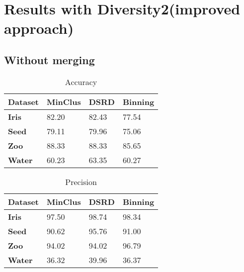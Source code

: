 \section{Results with Diversity2(improved approach)}
\subsection{Without merging}

\begin{table}[H]
\caption{Accuracy} 
\begin{center}
		\begin{tabular}{ | l | l | l | l |}
				\hline

				\textbf{Dataset} & \textbf{MinClus} & \textbf{DSRD} & \textbf{Binning} \\ \hline
                \textbf{Iris} & 82.20 & 82.43 & 77.54 \\ \hline
                \textbf{Seed} & 79.11 & 79.96 & 75.06 \\ \hline
                \textbf{Zoo} & 88.33 & 88.33 & 85.65  \\ \hline
                \textbf{Water} & 60.23 & 63.35 & 60.27  \\ \hline
		\end{tabular}
\end{center}
\label{table:acc1}
\end{table}



\begin{table}[H]
\caption{Precision} 
\begin{center}
		\begin{tabular}{ | l | l | l | l |}
				\hline

				\textbf{Dataset} & \textbf{MinClus} & \textbf{DSRD} & \textbf{Binning} \\ \hline

                \textbf{Iris} & 97.50 & 98.74 & 98.34 \\ \hline
                \textbf{Seed} & 90.62 & 95.76 & 91.00 \\ \hline
                \textbf{Zoo} & 94.02 & 94.02 & 96.79  \\ \hline
                \textbf{Water} & 36.32 & 39.96 & 36.37 \\ \hline
		\end{tabular}
\end{center}
\label{table:pre1}
\end{table}


